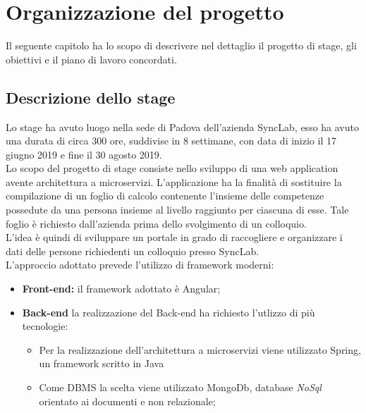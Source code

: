
\chapter{Organizzazione del progetto}
\label{cap:organizzazione-del-progetto}
Il seguente capitolo ha lo scopo di descrivere nel dettaglio il progetto di stage, gli obiettivi e il piano di lavoro concordati.

\section{Descrizione dello stage}
Lo stage ha avuto luogo nella sede di Padova dell'azienda SyncLab, esso ha avuto una durata di circa 300 ore, suddivise in 8 settimane, con data di inizio il 17 giugno 2019 e fine il 30 agosto 2019. \\
Lo scopo del progetto di stage consiste nello sviluppo di una \gls{web application} avente architettura a \gls{microservizi}.
L'applicazione ha la finalità di sostituire la compilazione di un foglio di calcolo contenente l'insieme delle competenze possedute da una persona insieme al livello raggiunto per ciascuna di esse. Tale foglio è richiesto dall'azienda prima dello svolgimento di un colloquio. \\
L'idea è quindi di sviluppare un portale in grado di raccogliere e organizzare i dati delle persone richiedenti un colloquio presso SyncLab.\\
L'approccio adottato prevede l'utilizzo di \gls{framework} moderni:

\begin{itemize}
	\item \textbf{Front-end:} il \gls{framework} adottato è \gls{Angular};
	\item \textbf{Back-end} la realizzazione del Back-end ha richiesto l'utlizzo di più tecnologie:
	\begin{itemize}
		\item Per la realizzazione dell'architettura a microservizi viene utilizzato \gls{Spring}, un \gls{framework} scritto in \gls{Java}
		\item Come \gls{DBMS} la scelta viene utilizzato \gls{MongoDb}, database \textit{NoSql} orientato ai documenti e non relazionale;
	\end{itemize}
\end{itemize}

